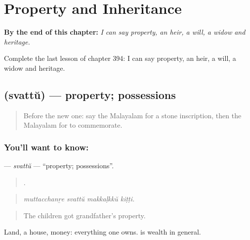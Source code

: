 
\chapter{Property and Inheritance}
\label{ch:ml-property-and-inheritance}

\begin{chapteropening}
\textbf{By the end of this chapter:} \emph{I can say property, an heir, a will, a widow and heritage.}

Complete the last lesson of chapter 394: I can say property, an heir, a will, a widow and heritage.
\end{chapteropening}

\section[\texorpdfstring{\ml{സ്വത്ത്} (svattŭ)}{സ്വത്ത് (svattŭ)}]{ (svattŭ) — property; possessions}

\label{lesson:ML-C394-svattu}



\begin{quote}
Before the new one: say the Malayalam for a stone inscription, then the Malayalam for to commemorate.
\end{quote}

\subsection*{You'll want to know: }
\textbf{} — \emph{svattŭ} — \textquotedblleft{}property; possessions\textquotedblright{}.

\begin{quote}
   .
\end{quote}

\begin{quote}
\emph{muttacchanṟe svattŭ makkaḷkkŭ kiṭṭi.}
\end{quote}

\begin{quote}
The children got grandfather's property.
\end{quote}

Land, a house, money: everything one owns.  is wealth in general.

